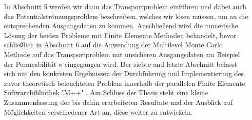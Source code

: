 In Abschnitt 5 werden wir dann das Transportproblem einführen und dabei auch das Potentialströmungsproblem beschreiben, welches wir lösen müssen, um an die entsprechenden Ausgangsdaten zu kommen. Anschließend wird die numerische Lösung der beiden Probleme mit Finite Elemente Methoden behandelt, bevor schließlich in Abschnitt 6 auf die Anwendung der Multilevel Monte Carlo Methode auf das Transportproblem mit unsicheren Ausgangsdaten am Beispiel der Permeabilität $\kappa$ eingegangen wird. \newline
Der siebte und letzte Abschnitt befasst sich mit den konkreten Ergebnissen der Durchführung und Implementierung des zuvor theoretisch beleuchteten Problem innerhalb der parallelen Finite Elemente Softwarebibliothek "M++" \cite{siteM++}.\newline
Am Schluss der Thesis steht eine kleine Zusammenfassung der bis dahin erarbeiteten Resultate und der Ausblick auf Möglichkeiten verschiedener Art an, diese weiter zu entwickeln.